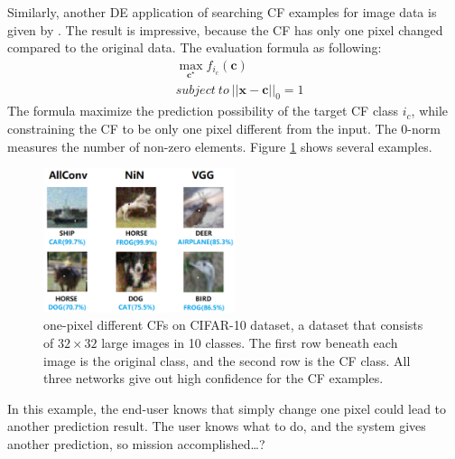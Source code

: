 Similarly, another DE application of searching CF examples for image data is given by \cite{onePixel}. The result is impressive, because the CF has only one pixel changed compared to the original data. The evaluation formula as following:
\begin{equation}\label{eq:onepixel}
  \begin{split}
     &\max_{\mathbf c^\star} f_{i_c}(\mathbf{c})\\
     &subject\ to\ ||\mathbf{x-c}||_0=1
  \end{split}
\end{equation}
The formula maximize the prediction possibility of the target CF class $i_c$, while constraining the CF to be only one pixel different from the input. The 0-norm measures the number of non-zero elements. Figure \ref{fig:onepixel} shows several examples.
\begin{figure}
  \centering
  \includegraphics[width=0.5\textwidth]{onepixel.PNG}
  \caption{one-pixel different CFs on CIFAR-10 dataset, a dataset that consists of $32\times32$ large images in 10 classes.
  The first row beneath each image is the original class, and the second row is the CF class. All three networks give out high confidence for the CF examples.}
  \label{fig:onepixel}
\end{figure}

In this example, the end-user knows that simply change one pixel could lead to another prediction result. The user knows what to do, and the system gives another prediction, so mission accomplished\dots?   